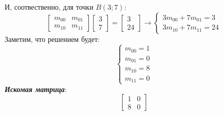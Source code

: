 \documentclass[a5paper, 10pt]{article}
\theoremstyle{definition}
\theoremstyle{plain}
\theoremstyle{remark}
\begin{document}
И, соотвественно, для точки $B(3;7)$:
\begin{equation}
\begin{bmatrix}
m_{0 0} & m_{0 1}\\
m_{1 0} & m_{1 1}
\end{bmatrix}
\begin{bmatrix}
3\\
7
\end{bmatrix}
=
\begin{bmatrix}
3\\
24
\end{bmatrix}
\to
\begin{cases}
3m_{0 0} +  7m_{0 1} = 3\\
3m_{1 0} + 7m_{1 1} = 24
\end{cases}
\end{equation}
Заметим, что решением будет: 
\begin{equation}
\begin{cases}
m_{0 0} = 1\\
m_{0 1} = 0\\
m_{1 0} = 8\\
m_{1 1} = 0
\end{cases}
\end{equation}
\textit{\textbf{Искомая матрица}}:
\begin{equation}
\begin{bmatrix}
1 & 0\\
8 & 0
\end{bmatrix}
\end{equation}
\\\\
\end{document}
